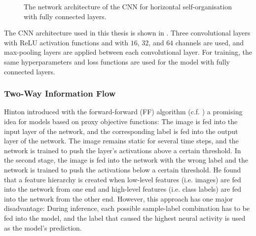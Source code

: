 \begin{figure}[h]
{
}
    \caption[Architecture of the CNN for horizontal self-organisation]{The network architecture of the CNN for horizontal self-organisation with fully connected layers.}
\end{figure}

The CNN architecture used in this thesis is shown in .
Three convolutional layers with ReLU activation functions and with $16$, $32$, and $64$ channels are used, and max-pooling layers are applied between each convolutional layer. For training, the same hyperparameters and loss functions are used for the model with fully connected layers.


\subsubsection{Two-Way Information Flow}
Hinton  introduced with the forward-forward (FF) algorithm (c.f. ) a promising idea for models based on proxy objective functions: 
The image is fed into the input layer of the network, and the corresponding label is fed into the output layer of the network. The image remains static for several time steps, and the network is trained to push the layer's activations above a certain threshold. In the second stage, the image is fed into the network with the wrong label and the network is trained to push the activations below a certain threshold. He found that a feature hierarchy is created when low-level features (i.e. images) are fed into the network from one end and high-level features (i.e. class labels) are fed into the network from the other end. However, this approach has one major disadvantage: During inference, each possible sample-label combination has to be fed into the model, and the label that caused the highest neural activity is used as the model's prediction.


